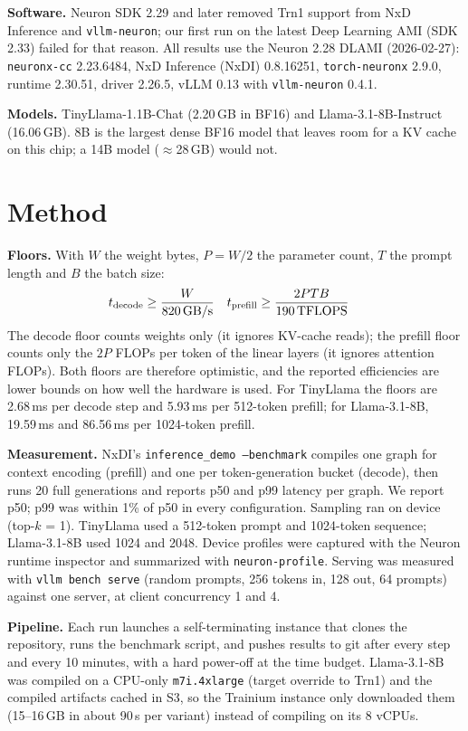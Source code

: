 \documentclass[11pt]{article}
\begin{document}
\textbf{Software.} Neuron SDK 2.29 and later removed Trn1 support from NxD Inference and \texttt{vllm-neuron}; our first run on the
latest Deep Learning AMI (SDK 2.33) failed for that reason. All results use the Neuron 2.28 DLAMI (2026-02-27):
\texttt{neuronx-cc} 2.23.6484, NxD Inference (NxDI) 0.8.16251, \texttt{torch-neuronx} 2.9.0, runtime 2.30.51, driver 2.26.5,
vLLM 0.13 with \texttt{vllm-neuron} 0.4.1.

\textbf{Models.} TinyLlama-1.1B-Chat (2.20\,GB in BF16) and Llama-3.1-8B-Instruct (16.06\,GB). 8B is the largest dense BF16 model
that leaves room for a KV cache on this chip; a 14B model ($\approx$28\,GB) would not.

\section{Method}
\textbf{Floors.} With $W$ the weight bytes, $P = W/2$ the parameter count, $T$ the prompt length and $B$ the batch size:
\begin{align*}
t_\text{decode} &\ge \frac{W}{\text{820\,GB/s}} &
t_\text{prefill} &\ge \frac{2PTB}{\text{190\,TFLOPS}}
\end{align*}
The decode floor counts weights only (it ignores KV-cache reads); the prefill floor counts only the $2P$ FLOPs per token of the
linear layers (it ignores attention FLOPs). Both floors are therefore optimistic, and the reported efficiencies are lower bounds on
how well the hardware is used. For TinyLlama the floors are 2.68\,ms per decode step and 5.93\,ms per 512-token prefill; for
Llama-3.1-8B, 19.59\,ms and 86.56\,ms per 1024-token prefill.

\textbf{Measurement.} NxDI's \texttt{inference\_demo --benchmark} compiles one graph for context encoding (prefill) and one per
token-generation bucket (decode), then runs 20 full generations and reports p50 and p99 latency per graph. We report p50;
p99 was within 1\% of p50 in every configuration. Sampling ran on device (top-$k$ = 1). TinyLlama used a 512-token prompt and
1024-token sequence; Llama-3.1-8B used 1024 and 2048. Device profiles were captured with the Neuron runtime inspector and summarized
with \texttt{neuron-profile}. Serving was measured with \texttt{vllm bench serve} (random prompts, 256 tokens in, 128 out, 64 prompts)
against one server, at client concurrency 1 and 4.

\textbf{Pipeline.} Each run launches a self-terminating instance that clones the repository, runs the benchmark script, and pushes
results to git after every step and every 10 minutes, with a hard power-off at the time budget. Llama-3.1-8B was compiled on a
CPU-only \texttt{m7i.4xlarge} (target override to Trn1) and the compiled artifacts cached in S3, so the Trainium instance only
downloaded them (15--16\,GB in about 90\,s per variant) instead of compiling on its 8 vCPUs.
\end{document}
